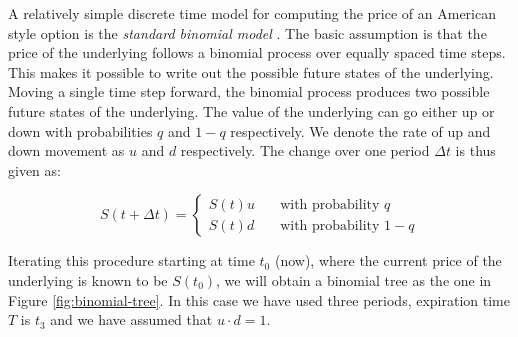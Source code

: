 \documentclass{llncs2e/llncs}
\begin{document}
A relatively simple discrete time model for computing the price of an
American style option is the \emph{standard binomial model}
\cite{cox1979option}.  The basic assumption is that the price of the
underlying follows a binomial process over equally spaced time
steps. This makes it possible to write out the possible future states
of the underlying. Moving a single time step forward, the binomial
process produces two possible future states of the underlying. The
value of the underlying can go either up or down with probabilities
$q$ and $1 - q$ respectively. We denote the rate of up and down
movement as $u$ and $d$ respectively. The change over one period
$\Delta t$ is thus given as:

\begin{equation}
S(t+\Delta t) = \left\{
  \begin{array}{ll}
    S(t)u & \quad \textrm{with probability $q$} \\
    S(t)d & \quad \textrm{with probability $1-q$}
  \end{array} \right.
\end{equation}

Iterating this procedure starting at time $t_0$ (now), where the
current price of the underlying is known to be $S(t_0)$, we will
obtain a binomial tree as the one in Figure
\ref{fig:binomial-tree}. In this case we have used three periods,
expiration time $T$ is $t_3$ and we have assumed that $u\cdot d = 1$.
\end{document}
